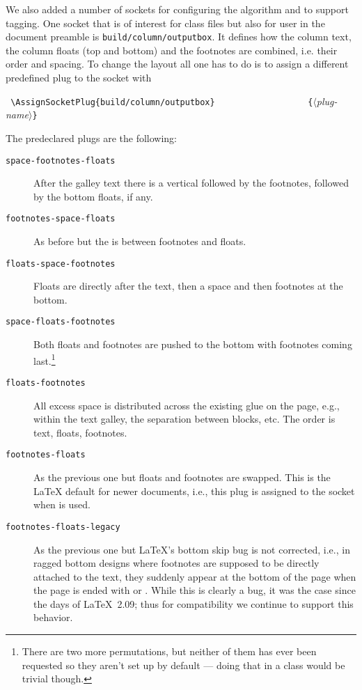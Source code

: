 \documentclass{ltnews}
\providecommand\socket[1]{\texttt{#1}}
\providecommand\plug[1]{\texttt{#1}}
\providecommand\meta[1]{$\langle$\textrm{\itshape#1}$\rangle$}
\begin{document}
We also added a number of sockets for configuring the algorithm and to
support tagging. One socket that is of interest for class files but
also for user in the document preamble is
\socket{build/column/outputbox}. It defines how the column text, the
column floats (top and bottom) and the footnotes are combined,
i.e. their order and spacing. To change the layout all one has to do
is to assign a different predefined plug to the socket with
\begin{flushleft}
  \verb= \AssignSocketPlug{build/column/outputbox}=
  \verb=                  {=\meta{plug-name}\verb=}=
\end{flushleft}
The predeclared plugs are the following:
\begin{description}
\item[\plug{space-footnotes-floats}]

   After the galley text there is a vertical 
   followed by the footnotes, followed by the bottom floats, if any.

\item[\plug{footnotes-space-floats}]

   As before but the  is between footnotes and floats.

\item[\plug{floats-space-footnotes}]

   Floats are directly after the text, then a space and then footnotes
   at the bottom.

\item[\plug{space-floats-footnotes}]

   Both floats and footnotes are pushed to the bottom with footnotes
   coming last.\footnote{There are two more permutations, but neither
   of them has ever been requested so they aren't set up by default
   --- doing that in a class would be trivial though.}

\item[\plug{floats-footnotes}]

   All excess space is distributed across the existing
   glue on the page, e.g., within the text galley, the
   separation between blocks, etc.
   The order is text, floats, footnotes.

\item[\plug{footnotes-floats}]

   As the previous one but floats and footnotes are swapped. This is
   the \LaTeX{} default for newer documents, i.e., this plug is
   assigned to the socket when  is used.

\item[\plug{footnotes-floats-legacy}]

   As the previous one but \LaTeX{}'s bottom skip bug is not
   corrected, i.e., in ragged bottom designs where footnotes
   are supposed to be directly attached to the text, they suddenly
   appear at the bottom of the page when the page is ended with
    or .
   While this is clearly a bug, it was the case since the days
   of \LaTeX~2.09; thus for
   compatibility we continue to support this behavior.
\end{description}
\end{document}
